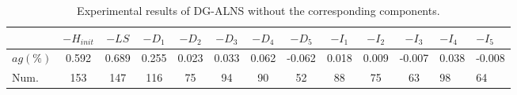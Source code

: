 \begin{table}[htbp]
    \centering
    \caption{Experimental results of DG-ALNS without the corresponding components.}
    \label{tab:component_analysis}
    \small
    \setlength{\tabcolsep}{4.2pt}
    \begin{tabular}{lcccccccccc}
        \toprule
        & $-H_{init}$ & $-LS$ & $-D_1$ & $-D_2$ & $-D_3$ & $-D_4$ & $-D_5$ & $-I_1$ & $-I_2$ & $-I_3$ & $-I_4$ & $-I_5$ \\
        \midrule
        $ag(\%)$ & 0.592 & 0.689 & 0.255 & 0.023 & 0.033 & 0.062 & -0.062 & 0.018 & 0.009 & -0.007 & 0.038 & -0.008 \\
        Num.     & 153 & 147 & 116 & 75 & 94 & 90 & 52 & 88 & 75 & 63 & 98 & 64 \\
        \bottomrule
    \end{tabular}
\end{table}